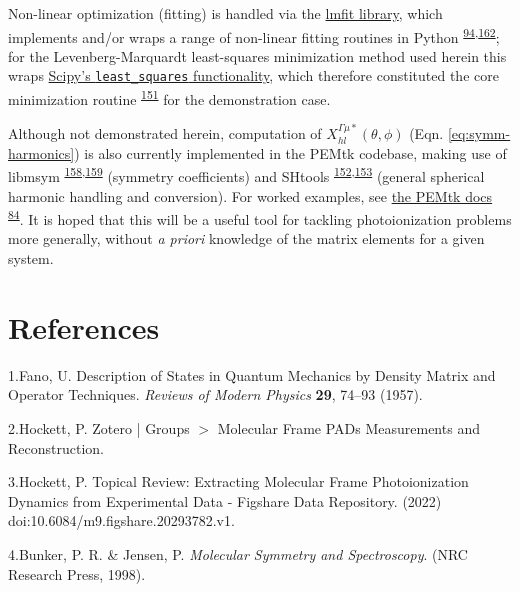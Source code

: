 \documentclass[10pt]{article}
\begin{document}
Non-linear optimization (fitting) is handled via the \href{https://lmfit.github.io/lmfit-py/index.html}{lmfit library}, which implements and/or wraps a range of non-linear fitting routines in Python \textsuperscript{\hyperref[csl:94]{94},\hyperref[csl:162]{162}}; for the Levenberg-Marquardt least-squares minimization method used herein this wraps 
\href{https://docs.scipy.org/doc/scipy/reference/generated/scipy.optimize.least_squares.html}{Scipy's \texttt{least\_squares} functionality}, which therefore constituted the core minimization routine \textsuperscript{\hyperref[csl:151]{151}} for the demonstration case.

Although not demonstrated herein, computation of $X_{hl}^{\Gamma\mu*}(\theta,\phi)$ (Eqn. \ref{eq:symm-harmonics}) is also currently implemented in the PEMtk codebase, making use of libmsym \textsuperscript{\hyperref[csl:158]{158},\hyperref[csl:159]{159}} (symmetry coefficients) and SHtools \textsuperscript{\hyperref[csl:152]{152},\hyperref[csl:153]{153}} (general spherical harmonic handling and conversion). For worked examples, see \href{https://pemtk.readthedocs.io/en/latest/sym/pemtk_symHarm_demo_160322_tidy.html}{the PEMtk docs} \textsuperscript{\hyperref[csl:84]{84}}. It is hoped that this will be a useful tool for tackling photoionization problems more generally, without \textit{a priori} knowledge of the matrix elements for a given system.

\FloatBarrier
\section*{References}\sloppy
{}
\label{csl:1}1.Fano, U. {Description of {{States}} in {{Quantum Mechanics}} by {{Density Matrix}} and {{Operator Techniques}}}. \textit{Reviews of Modern Physics} \textbf{29}, 74–93 (1957).

\label{csl:2}2.Hockett, P. {Zotero | {{Groups}} {$>$} {{Molecular Frame PADs Measurements}} and {{Reconstruction}}}.

\label{csl:3}3.Hockett, P. {Topical {{Review}}: {{Extracting Molecular Frame Photoionization Dynamics}} from {{Experimental Data}} - {{Figshare}} Data Repository}. (2022) doi:10.6084/m9.figshare.20293782.v1.

\label{csl:4}4.Bunker, P. R. \& Jensen, P. \textit{{Molecular {{Symmetry}} and {{Spectroscopy}}}}. ({NRC Research Press}, 1998).
\end{document}
